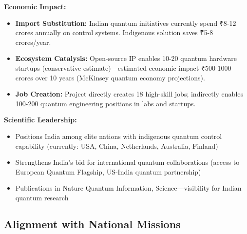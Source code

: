 \documentclass[12pt,a4paper]{article}
\begin{document}
\begin{enumerate}[leftmargin=*]
\textbf{Economic Impact:}
\begin{itemize}[leftmargin=*]
    \item \textbf{Import Substitution:} Indian quantum initiatives currently spend ₹8-12 crores annually on control systems. Indigenous solution saves ₹5-8 crores/year.
    \item \textbf{Ecosystem Catalysis:} Open-source IP enables 10-20 quantum hardware startups (conservative estimate)—estimated economic impact ₹500-1000 crores over 10 years (McKinsey quantum economy projections).
    \item \textbf{Job Creation:} Project directly creates 18 high-skill jobs; indirectly enables 100-200 quantum engineering positions in labs and startups.
\end{itemize}

\textbf{Scientific Leadership:}
\begin{itemize}[leftmargin=*]
    \item Positions India among elite nations with indigenous quantum control capability (currently: USA, China, Netherlands, Australia, Finland)
    \item Strengthens India's bid for international quantum collaborations (access to European Quantum Flagship, US-India quantum partnership)
    \item Publications in Nature Quantum Information, Science—visibility for Indian quantum research
\end{itemize}

\subsection{Alignment with National Missions}


\end{enumerate}
\end{document}
